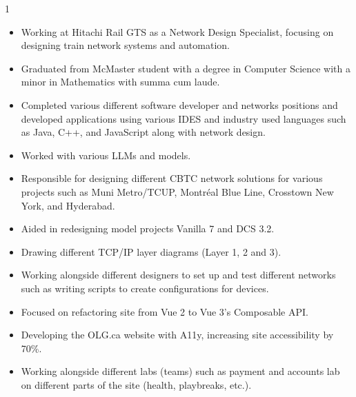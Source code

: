 \documentclass[10pt,a4paper,ragged2e,withhyper]{altacv}
\begin{document}

\makecvheader
\begin{paracol}{1}


  \begin{itemize}
    \item{Working at Hitachi Rail GTS as a Network Design Specialist, focusing on designing train network systems and automation.}
    \item {Graduated from McMaster student with a degree in Computer Science with a minor in Mathematics with summa cum laude.}
    \item {Completed various different software developer and networks positions and developed applications using various IDES and industry used languages such as Java, C++, and JavaScript along with network design.}
    \item {Worked with various LLMs and models.}
  \end{itemize}




  \begin{itemize}
    \item{Responsible for designing different CBTC network solutions for various projects such as Muni Metro/TCUP, Montréal Blue Line, Crosstown New York, and Hyderabad.}
    \item{Aided in redesigning model projects Vanilla 7 and DCS 3.2.}
    \item{Drawing different TCP/IP layer diagrams (Layer 1, 2 and 3).}
    \item{Working alongside different designers to set up and test different networks such as writing scripts to create configurations for devices.}
  \end{itemize}

  \begin{itemize}
    \item{Focused on refactoring site from Vue 2 to Vue 3's Composable API.}
    \item{Developing the OLG.ca website with A11y, increasing site accessibility by 70\%.}
    \item{Working alongside different labs (teams) such as payment and accounts lab on different parts of the site (health, playbreaks, etc.).}
  \end{itemize}


\end{paracol}
\end{document}
